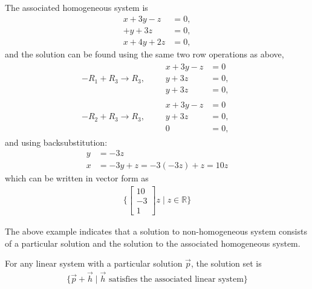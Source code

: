 \begin{example}
The associated homogeneous system is
%
\begin{align*}
x + 3y -z & = 0, \\
   + y + 3z & = 0, \\
x+4y +2z & = 0,
\end{align*}
and the solution can be found using the same two row operations as above,
%
\begin{align*}
-R_1+R_3 \rightarrow R_3, \qquad
\begin{split}
x + 3y - z & = 0 \\
y + 3z & = 0, \\
y + 3z & = 0,
\end{split} \\[12pt]
-R_2 + R_3 \rightarrow R_3, \qquad
\begin{split}
x + 3y - z & = 0 \\
y + 3z & = 0, \\
0 & = 0,
\end{split}
\end{align*}
and using backsubstitution:
%
\begin{align*}
y & = -3z \\
x & = -3y+z = -3(-3z)+z = 10z
\end{align*}
which can be written in vector form as
%
\begin{align*}
\{ \begin{bmatrix}
10 \\ -3 \\ 1
\end{bmatrix}z \; | \; z \in \mathbb{R} \}
\end{align*}

\end{example}


The above example indicates that a solution to non-homogeneous system consists of a particular solution and the solution to the associated homogeneous system.

\begin{lemma}
For any linear system with a particular solution $\vec{p}$, the solution set is
%
\begin{align*}
\{ \vec{p} + \vec{h} \; | \; \text{$\vec{h}$ satisfies the associated linear system} \}
\end{align*}
\end{lemma}

